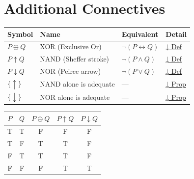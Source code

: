 
\section{Additional Connectives}

\begin{tcolorbox}[colback=gray!6, colframe=gray!40, arc=2pt,
  left=6pt, right=6pt, top=4pt, bottom=4pt,
  title={\small\textbf{Additional Connectives — Quick Reference}},
  fonttitle=\small\bfseries]
\small
\begin{tabular}{l l l l}
\toprule
\textbf{Symbol} & \textbf{Name} & \textbf{Equivalent} & \textbf{Detail} \\
\midrule
$P \oplus Q$    & XOR (Exclusive Or)  & $\neg(P \leftrightarrow Q)$  & \hyperref[def:xor]{↓ Def} \\
$P \uparrow Q$  & NAND (Sheffer stroke) & $\neg(P \wedge Q)$          & \hyperref[def:nand]{↓ Def} \\
$P \downarrow Q$& NOR (Peirce arrow)  & $\neg(P \vee Q)$             & \hyperref[def:nor]{↓ Def} \\
\midrule
$\{\uparrow\}$  & NAND alone is adequate & — & \hyperref[prop:nand-complete]{↓ Prop} \\
$\{\downarrow\}$& NOR alone is adequate  & — & \hyperref[prop:nor-complete]{↓ Prop} \\
\bottomrule
\end{tabular}
\end{tcolorbox}

\vspace{0.5em}

\begin{center}
\small
\renewcommand{\arraystretch}{1.2}
\begin{tabular}{cc|ccc}
\toprule
$P$ & $Q$ & $P \oplus Q$ & $P \uparrow Q$ & $P \downarrow Q$ \\
\midrule
T & T & F & F & F \\
T & F & T & T & F \\
F & T & T & T & F \\
F & F & F & T & T \\
\bottomrule
\end{tabular}
\end{center}


